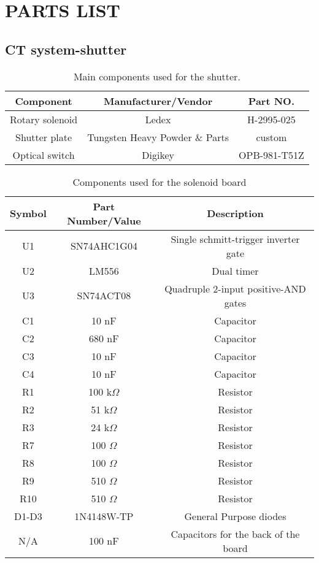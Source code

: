 \chapter{PARTS LIST}\label{app:partslist}


\section{CT system-shutter}

\begin{table}[h]
\begin{tabular}{c|c|c}
\hline
\textbf{Component} & \textbf{Manufacturer/Vendor} & \textbf{Part NO.} \\ \hline \hline
Rotary solenoid & Ledex & H-2995-025 \\ \hline
Shutter plate & Tungsten Heavy Powder \& Parts & custom \\ \hline
Optical switch & Digikey & OPB-981-T51Z \\ \hline
\end{tabular}
\caption{Main components used for the shutter.}
\label{table:shutter_components}
\end{table}

\begin{table}[h]
\begin{tabular}{c|c|c}
\hline
\textbf{Symbol} & \textbf{Part Number/Value} & \textbf{Description} \\
\hline
U1 & SN74AHC1G04 & Single schmitt-trigger inverter gate \\ \hline
U2 & LM556 & Dual timer \\ \hline
U3 & SN74ACT08 & Quadruple 2-input positive-AND gates \\ \hline
C1 & 10 nF & Capacitor \\ \hline
C2 & 680 nF & Capacitor \\ \hline
C3 & 10 nF & Capacitor \\ \hline
C4 & 10 nF & Capacitor \\ \hline
R1 & 100 k$\Omega$ & Resistor \\ \hline
R2 & 51 k$\Omega$ & Resistor \\ \hline
R3 & 24 k$\Omega$ & Resistor \\ \hline
R7 & 100 $\Omega$ & Resistor \\ \hline
R8 & 100 $\Omega$ & Resistor \\ \hline
R9 & 510 $\Omega$ & Resistor \\ \hline
R10 & 510 $\Omega$ & Resistor \\ \hline
D1-D3 & 1N4148W-TP & General Purpose diodes\\ \hline
N/A & 100 nF & Capacitors for the back of the board\\ \hline
\end{tabular}
\caption{Components used for the solenoid board}
\label{table:solenoid_components}
\end{table}



